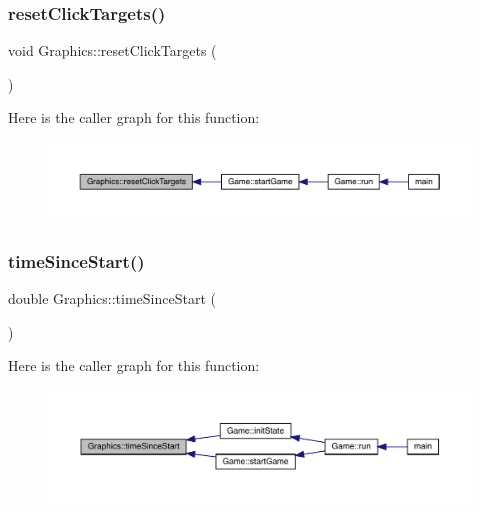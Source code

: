 \subsubsection{\texorpdfstring{reset\+Click\+Targets()}{resetClickTargets()}}
{\footnotesize\ttfamily void Graphics\+::reset\+Click\+Targets (\begin{DoxyParamCaption}{ }\end{DoxyParamCaption})}

Here is the caller graph for this function\+:\nopagebreak
\begin{figure}[H]
\begin{center}
\leavevmode
\includegraphics[width=350pt]{class_graphics_aedd2af95b26f8b2077e266f692818ea2_icgraph}
\end{center}
\end{figure}
\mbox{\label{class_graphics_a35b4a23e0938ba205ce2a73ee7df5ea0}} 
\subsubsection{\texorpdfstring{time\+Since\+Start()}{timeSinceStart()}}
{\footnotesize\ttfamily double Graphics\+::time\+Since\+Start (\begin{DoxyParamCaption}{ }\end{DoxyParamCaption})}

Here is the caller graph for this function\+:\nopagebreak
\begin{figure}[H]
\begin{center}
\leavevmode
\includegraphics[width=350pt]{class_graphics_a35b4a23e0938ba205ce2a73ee7df5ea0_icgraph}
\end{center}
\end{figure}
\mbox{\label{class_graphics_a3621b0f55951fb891a5ac2ad7dd403a0}} 
